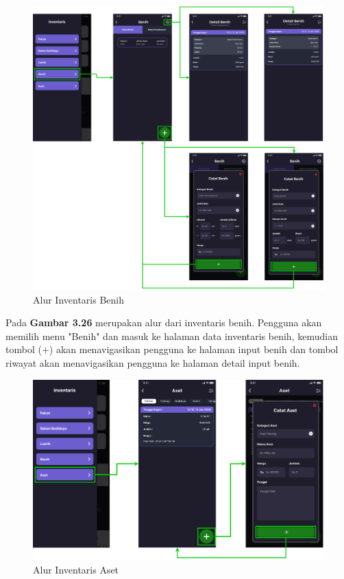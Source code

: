 \begin{enumerate}
\begin{enumerate}
		\begin{figure}[H]
			\centering
			\includegraphics[width=1\textwidth]{gambar/sprint2/flow_seed.png}
			\caption{Alur Inventaris Benih}
		\end{figure}

		Pada \textbf{Gambar 3.26} merupakan alur dari inventaris benih. Pengguna akan memilih menu "Benih" dan masuk ke halaman data inventaris benih, kemudian tombol (+) akan menavigasikan pengguna ke halaman input benih dan tombol riwayat akan menavigasikan pengguna ke halaman detail input benih.

		\begin{figure}[H]
			\centering
			\includegraphics[width=1\textwidth]{gambar/sprint2/flow_asset.png}
			\caption{Alur Inventaris Aset}
		\end{figure}


\end{enumerate}
\end{enumerate}

